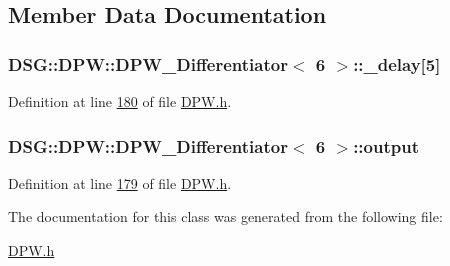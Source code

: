 \subsection{Member Data Documentation}
\hypertarget{class_d_s_g_1_1_d_p_w_1_1_d_p_w___differentiator_3_016_01_4_a8f3e45aa44791b711f6e71aff92505ca}{
\subsubsection[{\+\_\+delay}]{ {\bf D\+S\+G\+::\+D\+P\+W\+::\+D\+P\+W\+\_\+\+Differentiator}$<$ 6 $>$\+::\+\_\+delay\mbox{[}5\mbox{]}\hspace{0.3cm}{\ttfamily [protected]}}}\label{class_d_s_g_1_1_d_p_w_1_1_d_p_w___differentiator_3_016_01_4_a8f3e45aa44791b711f6e71aff92505ca}


Definition at line \hyperlink{_d_p_w_8h_source_l00180}{180} of file \hyperlink{_d_p_w_8h_source}{D\+P\+W.\+h}.

\hypertarget{class_d_s_g_1_1_d_p_w_1_1_d_p_w___differentiator_3_016_01_4_a6939d53801d66571b5935bcd5561548a}{
\subsubsection[{output}]{ {\bf D\+S\+G\+::\+D\+P\+W\+::\+D\+P\+W\+\_\+\+Differentiator}$<$ 6 $>$\+::output\hspace{0.3cm}{\ttfamily [protected]}}}\label{class_d_s_g_1_1_d_p_w_1_1_d_p_w___differentiator_3_016_01_4_a6939d53801d66571b5935bcd5561548a}


Definition at line \hyperlink{_d_p_w_8h_source_l00179}{179} of file \hyperlink{_d_p_w_8h_source}{D\+P\+W.\+h}.



The documentation for this class was generated from the following file\+:\begin{DoxyCompactItemize}
\item 
\hyperlink{_d_p_w_8h}{D\+P\+W.\+h}\end{DoxyCompactItemize}
